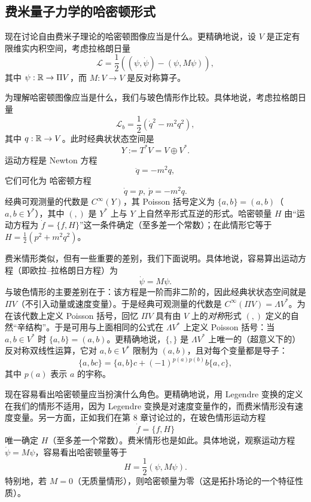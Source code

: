 \subsection{费米量子力学的哈密顿形式}

现在讨论自由费米子理论的哈密顿图像应当是什么。更精确地说，设 $V$ 是正定有限维实内积空间，考虑拉格朗日量
$$
{\mathcal L}=\frac{1}{2}((\psi,\dot{\psi})-(\psi,M\psi)),
$$
其中 $\psi: \Bbb R\to \Pi V$，而 $M:V\to V$ 是反对称算子。

为理解哈密顿图像应当是什么，我们与玻色情形作比较。具体地说，考虑拉格朗日量
$$
{\mathcal L}_b=\frac{1}{2}(\dot{q}^2-m^2q^2),
$$
其中 $q:\Bbb R\to V$。此时经典状状态空间是
$$
Y:=T^*V=V\oplus
V^*.
$$
运动方程是 Newton 方程
$$
\ddot{q}=-m^2q,
$$
它们可化为 哈密顿方程
$$
\dot{q}=p,\ \dot{p}=-m^2q.
$$
经典可观测量的代数是 $C^\infty(Y)$，其 Poisson 括号定义为 $\lbrace{a,b\rbrace}=(a,b)$（$a,b\in Y^*$），其中 $(,)$ 是 $Y^*$ 上与 $Y$ 上自然辛形式互逆的形式。哈密顿量 $H$ 由“运动方程为 $\dot{f}=\lbrace{f,H\rbrace}$”这一条件确定（至多差一个常数）；在此情形它等于 $H=\frac{1}{2}(p^2+m^2q^2)$。

费米情形类似，但有一些重要的差别，我们下面说明。具体地说，容易算出运动方程（即欧拉–拉格朗日方程）为
$$
\dot{\psi}=M\psi.
$$
与玻色情形的主要差别在于：该方程是一阶而非二阶的，因此经典状状态空间就是 $\Pi V$（不引入动量或速度变量）。于是经典可观测量的代数是 $C^\infty(\Pi V)=\Lambda V^*$。为在该代数上定义 Poisson 括号，回忆 $\Pi V$ 具有由 $V$ 上的\emph{对称}形式 $(,)$ 定义的自然“辛结构”。于是可用与上面相同的公式在 $\Lambda V^*$ 上定义 Poisson 括号：当 $a,b\in V^*$ 时 $\lbrace{a,b\rbrace}=(a,b)$。更精确地说，$\lbrace{,\rbrace}$ 是 $\Lambda V^*$ 上唯一的（超意义下的）反对称双线性运算，它对 $a,b\in V^*$ 限制为 $(a,b)$，且对每个变量都是导子：
$$
\lbrace{a,bc\rbrace}=\lbrace{a,b\rbrace}c+(-1)^{p(a)p(b)}b\lbrace{a,c\rbrace},
$$
其中 $p(a)$ 表示 $a$ 的宇称。


现在容易看出哈密顿量应当扮演什么角色。更精确地说，用 Legendre 变换的定义在我们的情形不适用，因为 Legendre 变换是对速度变量作的，而费米情形没有速度变量。另一方面，正如我们在第 8 章讨论过的，在玻色情形运动方程
$$
\dot{f}=\lbrace{f,H\rbrace}
$$
唯一确定 $H$（至多差一个常数）。费米情形也是如此。具体地说，观察运动方程 $\dot{\psi}=M\psi$，容易看出哈密顿量等于
$$
H=\frac{1}{2}(\psi,M\psi).
$$
特别地，若 $M=0$（无质量情形），则哈密顿量为零（这是拓扑场论的一个特征性质）。

